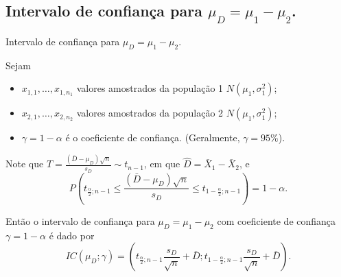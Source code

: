 \documentclass[9pt]{beamer}
\begin{document}
\subsection{Intervalo de confiança para $\mu_D = \mu_1 - \mu_2$.}

\begin{frame}{Intervalo de confiança para $\mu_D = \mu_1 - \mu_2$.}

\normalsize

Sejam
\begin{itemize}
	\item $x_{1,1}, \dots, x_{1,n_1}$ valores amostrados da população 1 $N(\mu_1, \sigma_1^2)$;
	\item $x_{2,1}, \dots, x_{2,n_2}$ valores amostrados da população 2 $N(\mu_1, \sigma_1^2)$;
	\item $\gamma=1-\alpha$ é o coeficiente de confiança. (Geralmente, $\gamma=95\%$).
\end{itemize}
\vfill

Note que $T = \frac{(\bar{D} -\mu_D)\sqrt{n} }{s_D} \sim t_{n-1}$, em que $\hat{D} = \bar{X}_1 - \bar{X}_2$, e 
$$P\left( t_{\frac{\alpha}{2}; n-1} \leq \frac{(\bar{D} -\mu_D) \sqrt{n} }{s_D} \leq t_{1-\frac{\alpha}{2}; n-1} \right) = 1 - \alpha.$$
\vfill

Então o intervalo de confiança para $\mu_D = \mu_1 - \mu_2$ com coeficiente de confiança $\gamma=1-\alpha$ é dado por
$$IC\left(\mu_D; \gamma\right) = \left( t_{\frac{\alpha}{2}; n-1} \frac{s_D}{\sqrt{n}} + \bar{D}; t_{1-\frac{\alpha}{2}; n-1} \frac{s_D}{\sqrt{n}} + \bar{D} \right).$$


\normalsize
\end{frame}
\end{document}
